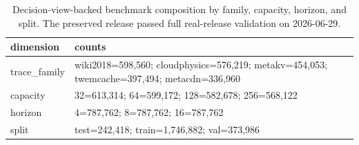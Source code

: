 \begin{table}[t]
  \centering
  \footnotesize
  \caption{Decision-view-backed benchmark composition by family, capacity, horizon, and split. The preserved release passed full real-release validation on 2026-06-29.}
  \label{tab:decision-breakdown}
  \begin{tabular}{lp{}}
    \toprule
    dimension & counts \\
    \midrule
    trace\_family & wiki2018=598,560; cloudphysics=576,219; metakv=454,053; twemcache=397,494; metacdn=336,960 \\
    capacity & 32=613,314; 64=599,172; 128=582,678; 256=568,122 \\
    horizon & 4=787,762; 8=787,762; 16=787,762 \\
    split & test=242,418; train=1,746,882; val=373,986 \\
    \bottomrule
  \end{tabular}
\end{table}
